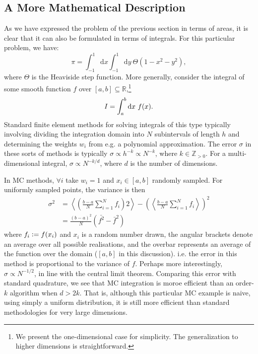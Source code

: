 \subsection{A More Mathematical Description}

As we have expressed the problem of the previous section in terms of areas, it is clear that it can also be formulated in terms of integrals. For this particular problem, we have:
\begin{equation}
    \pi = \int_{-1}^1  \mathrm{d}x \int_{-1}^1 \mathrm{d}y\ \Theta(1-x^2-y^2) ,
\end{equation}
where $\Theta$ is the Heaviside step function.
More generally, consider the integral of some smooth function $f$ over $[a,b]\subseteq \mathbb{R}$,\footnote{We present the one-dimensional case for simplicity. The generalization to higher dimensions is straightforward.}
\begin{equation}
    I = \int_a^b \mathrm{d} x \ f(x).
\end{equation}
Standard finite element methods for solving integrals of this type typically involving dividing the integration domain into $N$ subintervals of length $h$ and determining the weights $w_i$ from e.g. a polynomial approximation. The error $\sigma$ in these sorts of methods is typically $\sigma\propto h^{-k} \propto N^{-k}$, where $k\in\mathbb{Z}_{>0}$. For a multi-dimensional integral, $\sigma\propto N^{-k/d}$, where $d$ is the number of dimensions.\cite{ascherFirst2011}

In \gls{MC} methods, $\forall i$ take $w_i=1$ and $x_i\in[a,b]$ randomly sampled. For uniformly sampled points, the variance is then
\begin{align}
    \sigma^2 &= \left\langle \left( \frac{b-a}{N}\sum^N_{i=1}f_i\right)2\right\rangle - \left( \left\langle  \frac{b-a}{N}\sum^N_{i=1}f_i\right\rangle\right)^2 \\
    &= \frac{(b-a)^2}{N}(\bar{f^2} - \bar f^2)
\end{align}
where $f_i\mathrel{\mathop:}= f(x_i)$ and $x_i$ is a random number drawn, the angular brackets denote an average over all possible realisations, and the overbar represents an average of the function over the domain ($[a,b]$ in this discussion). i.e. the error in this method is proportional to the variance of $f$. Perhaps more interestingly, $\sigma\propto N^{-1/2}$, in line with the central limit theorem.\supercite{bernoulliJacobi1713} Comparing this error with standard quadrature, we see that MC integration is moroe efficient than an order-$k$ algorithm when $d>2k$. That is, although this particular \gls{MC} example is naive, using simply a uniform distribution, it is still more efficient than standard methodologies for very large dimensions.

